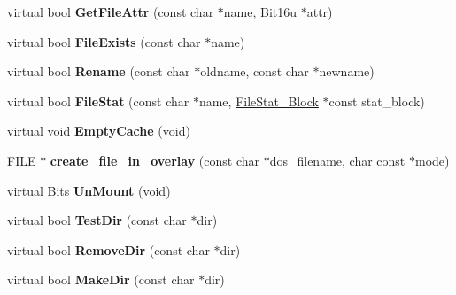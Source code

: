 \begin{DoxyCompactItemize}
\item 
\hypertarget{classOverlay__Drive_ae42eacb74c8dee6dfb26f43e0be5ee6e}{virtual bool {\bfseries Get\-File\-Attr} (const char $\ast$name, Bit16u $\ast$attr)}\label{classOverlay__Drive_ae42eacb74c8dee6dfb26f43e0be5ee6e}

\item 
\hypertarget{classOverlay__Drive_a2f2fb05ecf1b9c50bf8736ba0eb4b158}{virtual bool {\bfseries File\-Exists} (const char $\ast$name)}\label{classOverlay__Drive_a2f2fb05ecf1b9c50bf8736ba0eb4b158}

\item 
\hypertarget{classOverlay__Drive_ae31742fe5278699503638791c2b7651a}{virtual bool {\bfseries Rename} (const char $\ast$oldname, const char $\ast$newname)}\label{classOverlay__Drive_ae31742fe5278699503638791c2b7651a}

\item 
\hypertarget{classOverlay__Drive_a651dff8d35a9575b2d84bc353bd3300e}{virtual bool {\bfseries File\-Stat} (const char $\ast$name, \hyperlink{structFileStat__Block}{File\-Stat\-\_\-\-Block} $\ast$const stat\-\_\-block)}\label{classOverlay__Drive_a651dff8d35a9575b2d84bc353bd3300e}

\item 
\hypertarget{classOverlay__Drive_a9510e57e848823ec054fd7bf00e38400}{virtual void {\bfseries Empty\-Cache} (void)}\label{classOverlay__Drive_a9510e57e848823ec054fd7bf00e38400}

\item 
\hypertarget{classOverlay__Drive_a6df91b2b965a9d9b299cd7068f1b1d54}{F\-I\-L\-E $\ast$ {\bfseries create\-\_\-file\-\_\-in\-\_\-overlay} (const char $\ast$dos\-\_\-filename, char const $\ast$mode)}\label{classOverlay__Drive_a6df91b2b965a9d9b299cd7068f1b1d54}

\item 
\hypertarget{classOverlay__Drive_a9db390cb67209040cb12e87d8844d1fa}{virtual Bits {\bfseries Un\-Mount} (void)}\label{classOverlay__Drive_a9db390cb67209040cb12e87d8844d1fa}

\item 
\hypertarget{classOverlay__Drive_a2c2a5df98a34259f41a3c4c9fcf9e057}{virtual bool {\bfseries Test\-Dir} (const char $\ast$dir)}\label{classOverlay__Drive_a2c2a5df98a34259f41a3c4c9fcf9e057}

\item 
\hypertarget{classOverlay__Drive_ad19396326de3796881062aa96bed0f59}{virtual bool {\bfseries Remove\-Dir} (const char $\ast$dir)}\label{classOverlay__Drive_ad19396326de3796881062aa96bed0f59}

\item 
\hypertarget{classOverlay__Drive_a16647b260ccf760b506894c5b920a79d}{virtual bool {\bfseries Make\-Dir} (const char $\ast$dir)}\label{classOverlay__Drive_a16647b260ccf760b506894c5b920a79d}

\end{DoxyCompactItemize}
